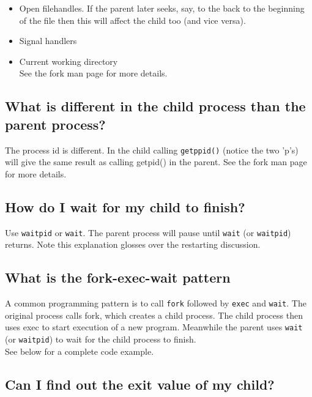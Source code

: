 \begin{itemize}
\itemsep1pt\parskip0pt
\item
  Open filehandles. If the parent later seeks, say, to the back to the
  beginning of the file then this will affect the child too (and vice
  versa).
\item
  Signal handlers
\item
  Current working directory\\See the fork man page for more details.
\end{itemize}

\subsection{What is different in the child process than the parent
process?}\label{what-is-different-in-the-child-process-than-the-parent-process}

The process id is different. In the child calling \texttt{getppid()}
(notice the two 'p's) will give the same result as calling getpid() in
the parent. See the fork man page for more details.

\subsection{How do I wait for my child to
finish?}\label{how-do-i-wait-for-my-child-to-finish}

Use \texttt{waitpid} or \texttt{wait}. The parent process will pause
until \texttt{wait} (or \texttt{waitpid}) returns. Note this explanation
glosses over the restarting discussion.

\subsection{What is the fork-exec-wait
pattern}\label{what-is-the-fork-exec-wait-pattern}

A common programming pattern is to call \texttt{fork} followed by
\texttt{exec} and \texttt{wait}. The original process calls fork, which
creates a child process. The child process then uses exec to start
execution of a new program. Meanwhile the parent uses \texttt{wait} (or
\texttt{waitpid}) to wait for the child process to finish.\\See below
for a complete code example.

\subsection{Can I find out the exit value of my
child?}\label{can-i-find-out-the-exit-value-of-my-child}

